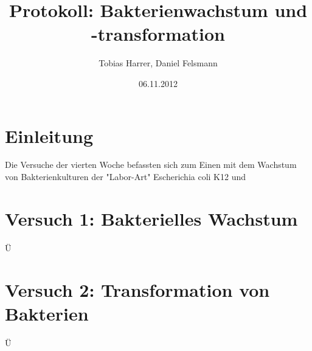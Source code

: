 \documentclass[12pt,twoside]{article}
\begin{document}
\author{Tobias Harrer, Daniel Felsmann}
\title{Protokoll: Bakterienwachstum und -transformation}
\date{06.11.2012}
\maketitle
\tableofcontents
\newpage 
\section{Einleitung}
Die Versuche der vierten Woche befassten sich zum Einen mit dem Wachstum von Bakterienkulturen der "Labor-Art" Escherichia coli K12 und 

\section{Versuch 1: Bakterielles Wachstum}
Ü

\section{Versuch 2: Transformation von Bakterien}
Ü
\end{document}
